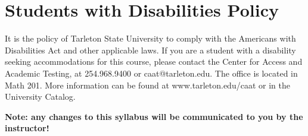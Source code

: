 \documentclass[10pt]{article}
\begin{document}
\section*{Students with Disabilities Policy}
\label{sec-10}

It is the policy of Tarleton State University to comply with the Americans with Disabilities Act and other applicable laws. If you are a student with a disability seeking accommodations for this course, please contact the Center for Access and Academic Testing, at 254.968.9400 or caat@tarleton.edu. The office is located in Math 201. More information can be found at www.tarleton.edu/caat or in the University Catalog.



\textbf{\textbf{Note:  any changes to this syllabus will be communicated to you by the instructor!}}
\end{document}
